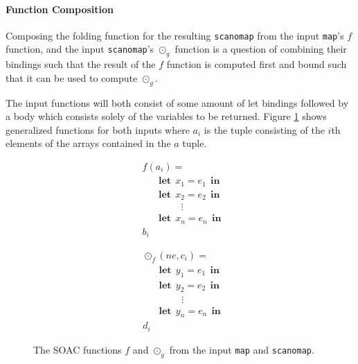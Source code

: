 \documentclass[11pt]{article}
\newcommand\lett{\phantom{-}\:\:\mathbf{let}\:\:}
\newcommand\inn{\:\:\mathbf{in}\:\:}
\begin{document}
\paragraph{Function Composition}
\setcounter{equation}{0}
Composing the folding function for the resulting \texttt{scanomap} from the input \texttt{map}'s $f$ function, and the input \texttt{scanomap}'s $\odot_g$ function is a question of combining their
 bindings such that the result of the $f$ function is computed first and bound such that it can be used to compute $\odot_g$.

The input functions will both consist of some amount of let bindings followed by a body which consists solely of the variables to be returned. Figure \ref{fig:bothfuns} shows generalized functions for both
 inputs where $a_i$ is the tuple consisting of the $i$th elements of the arrays contained in the $a$ tuple. 
 \begin{figure}[hb!]

   \begin{mdframed}
 \begin{minipage}{0.5\linewidth}
     \centering

       \begin{align*}
         &f(a_i) = \\
         &\lett x_1 = e_1 \inn\\
         &\lett x_2 = e_2 \inn\\
         &\phantom{----}\vdots\\
         &\lett x_n = e_n \inn\\
         &b_i
       \end{align*}

     \label{fig:mapf}
 \end{minipage}
 \begin{minipage}{0.5\linewidth}
     \centering

     \begin{align*}
       &\odot_f(ne, c_i) = \\
       &\lett y_1 = e_1 \inn\\
       &\lett y_2 = e_2 \inn\\
       &\phantom{----}\vdots\\
       &\lett y_n = e_n \inn\\
       &d_i
     \end{align*}

     \label{fig:odotg}
   \end{minipage}

     \end{mdframed}
     \caption{The SOAC functions $f$ and $\odot_g$ from the input
       \texttt{map} and \texttt{scanomap}.}
     \label{fig:bothfuns}
\end{figure}
\end{document}

